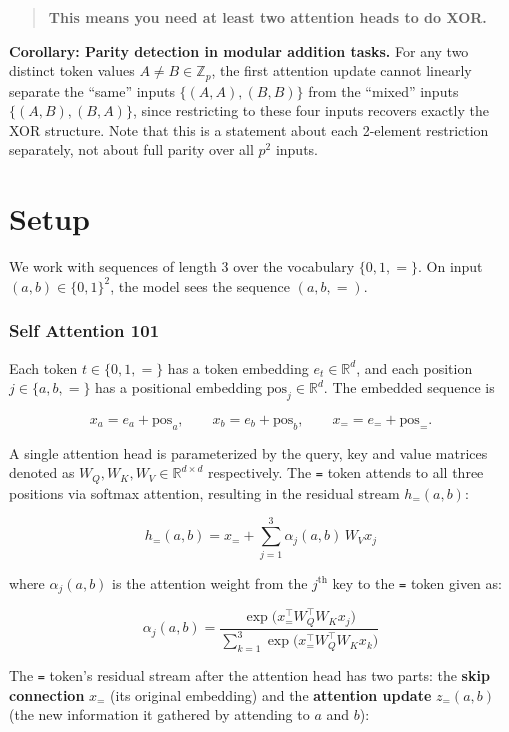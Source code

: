 \documentclass[
  11pt,
]{article}
\begin{document}
\begin{quote}
\textbf{This means you need at least two attention heads to do XOR.}
\end{quote}

\textbf{Corollary: Parity detection in modular addition tasks.} For any
two distinct token values \(A \neq B \in \mathbb{Z}_p\), the first
attention update cannot linearly separate the ``same'' inputs
\(\{(A, A), (B, B)\}\) from the ``mixed'' inputs \(\{(A, B), (B, A)\}\),
since restricting to these four inputs recovers exactly the XOR
structure. Note that this is a statement about each 2-element
restriction separately, not about full parity over all \(p^2\) inputs.

\section{Setup}\label{setup}

We work with sequences of length 3 over the vocabulary \(\{0,1,=\}\). On
input \((a,b) \in \{0,1\}^2\), the model sees the sequence
\((a, b, =)\).

\subsubsection{Self Attention 101}\label{self-attention-101}

Each token \(t \in \{0,1,=\}\) has a token embedding
\(e_t \in \mathbb{R}^d\), and each position \(j \in \{a,b,=\}\) has a
positional embedding \(\text{pos}_j \in \mathbb{R}^d\). The embedded
sequence is

\[
x_a=e_a+\text{pos}_a,\qquad x_b=e_b+\text{pos}_b,\qquad x_==e_{=}+\text{pos}_=.
\]

A single attention head is parameterized by the query, key and value
matrices denoted as \(W_Q, W_K, W_V \in \mathbb{R}^{d \times d}\)
respectively. The \texttt{=} token attends to all three positions via
softmax attention, resulting in the residual stream \(h_=(a,b)\):

\[
h_=(a,b)= x_=+\sum_{j=1}^3 \alpha_j(a,b)\,W_Vx_j
\]

where \(\alpha_j(a,b)\) is the attention weight from the
\(j^{\text{th}}\) key to the \texttt{=} token given as:

\[
\alpha_j(a,b)=\dfrac{\exp\bigl(x_=^\top W_Q^\top W_K x_j\bigr)}{\sum_{k=1}^3 \exp\bigl(x_=^\top W_Q^\top W_K x_k\bigr)}
\]

The \texttt{=} token's residual stream after the attention head has two
parts: the \textbf{skip connection} \(x_=\) (its original embedding) and
the \textbf{attention update} \(z_=(a,b)\) (the new information it
gathered by attending to \(a\) and \(b\)):
\end{document}
